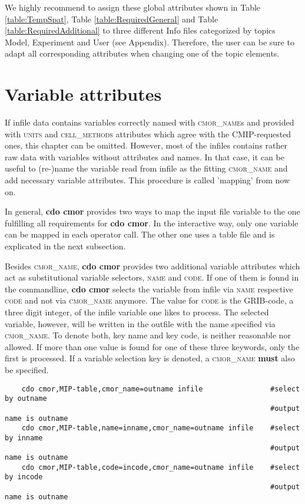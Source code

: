 We highly recommend to assign these global attributes shown in Table  \ref{table:TempSpat}, Table \ref{table:RequiredGeneral} and Table \ref{table:RequiredAdditional} to three different Info files categorized by topics Model, Experiment and User (see Appendix). Therefore, the user can be sure to adapt all corresponding attributes when changing one of the topic elements.

\section{Variable attributes}

If infile data contains variables correctly named with \textsc{cmor\_name}s and provided with \textsc{units} and \textsc{cell\_methods} attributes which agree with the CMIP-requested ones, this chapter can be omitted. However, most of the infiles contains rather raw data with variables without attributes and names. In that case, it can be useful to (re-)name the variable read from infile as the fitting \textsc{cmor\_name} and add necessary variable attributes. This procedure is called 'mapping' from now on.

In general, \textbf{cdo cmor} provides two ways to map the input file variable to the one fulfilling all requirements for \textbf{cdo cmor}.  In the interactive way, only one variable can be mapped in each operator call. The other one uses a table file and is explicated in the next subsection.

Besides \textsc{cmor\_name}, \textbf{cdo cmor} provides two additional variable attributes which act as substitutional variable selectors, \textsc{name} and \textsc{code}. If one of them is found in the commandline, \textbf{cdo cmor} selects the variable from infile via \textsc{name} respective \textsc{code} and not via \textsc{cmor\_name} anymore. The value for \textsc{code} is the GRIB-code, a three digit integer, of the infile variable one likes to process. The selected variable, however, will be written in the outfile with the name specified via \textsc{cmor\_name}. To denote both, key name and key code, is neither reasonable nor allowed. If more than one value is found for one of these three keywords, only the first is processed. If a variable selection key is denoted, a \textsc{cmor\_name} \textbf{must} also be specified.

\begin{verbatim}
    cdo cmor,MIP-table,cmor_name=outname infile                #select by outname
                                                               #output name is outname
    cdo cmor,MIP-table,name=inname,cmor_name=outname infile    #select by inname
                                                               #output name is outname
    cdo cmor,MIP-table,code=incode,cmor_name=outname infile    #select by incode
                                                               #output name is outname
\end{verbatim}

